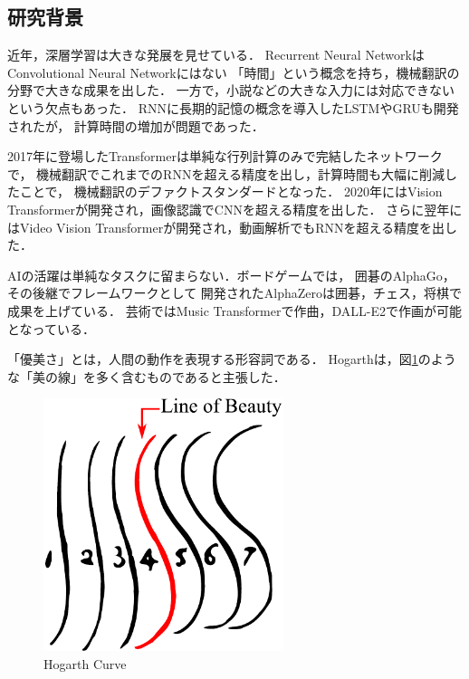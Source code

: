 \subsection{研究背景}
近年，深層学習は大きな発展を見せている．
Recurrent Neural Network\cite{rnn}はConvolutional Neural Network\cite{cnn}にはない
「時間」という概念を持ち，機械翻訳の分野で大きな成果を出した．
一方で，小説などの大きな入力には対応できないという欠点もあった．
RNNに長期的記憶の概念を導入したLSTM\cite{lstm}やGRU\cite{gru}も開発されたが，
計算時間の増加が問題であった．

2017年に登場したTransformer\cite{transformer}は単純な行列計算のみで完結したネットワークで，
機械翻訳でこれまでのRNNを超える精度を出し，計算時間も大幅に削減したことで，
機械翻訳のデファクトスタンダードとなった．
2020年にはVision Transformer\cite{vit}が開発され，画像認識でCNNを超える精度を出した．
さらに翌年にはVideo Vision Transformer\cite{vivit}が開発され，動画解析でもRNNを超える精度を出した．

AIの活躍は単純なタスクに留まらない．ボードゲームでは，
囲碁のAlphaGo\cite{alphago}，その後継でフレームワークとして
開発されたAlphaZero\cite{alphazero}は囲碁，チェス，将棋で成果を上げている．
芸術ではMusic Transformer\cite{mut}で作曲，DALL-E2\cite{dalle2}で作画が可能となっている．

「優美さ」とは，人間の動作を表現する形容詞である．
Hogarthは，図\ref{hogarth_curve}のような「美の線」を多く含むものであると主張した．

\begin{figure}[b]
  \begin{center}
    \includegraphics[width=70mm]{images/hogarth_curve.pdf}
  \end{center}
  \caption{Hogarth Curve}
  \label{hogarth_curve}
\end{figure}

